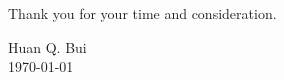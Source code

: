 \documentclass[12pt]{article}
\begin{document}
\noindent Thank you for your time and consideration.\\ \vspace{-9pt}

\noindent Huan Q. Bui\\
\today


%	
%	 

	

















	
	
	
	
	
\end{document}
